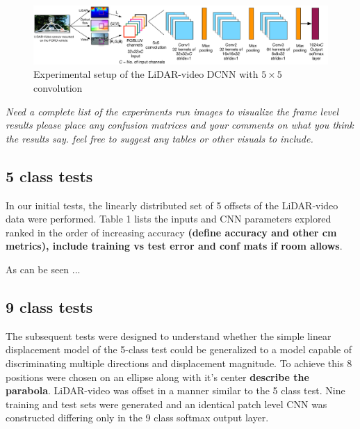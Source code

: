 \documentclass{article}
\begin{document}
\begin{figure}[htbp]
    \centering
        \includegraphics[scale=0.35]{Figures/lidar_dcnn_setup1.pdf}
    \caption{Experimental setup of the LiDAR-video DCNN with $5\times5$ convolution}
    \label{fig:Figures_lidar_dcnn_setup1}
\end{figure}

\textit{Need a complete list of the experiments run
images to visualize the frame level results
please place any confusion matrices and your comments on what you think the results say.
feel free to suggest any tables or other visuals to include.}




\subsection{5 class tests} %
\label{sub:5_class_tests}
In our initial tests, the linearly distributed set of 5 offsets of the LiDAR-video data were performed. Table 1 lists the inputs and CNN parameters explored ranked in the order of increasing accuracy \textbf{(define accuracy and other cm metrics), include training vs test error and conf mats if room allows}.  

As can be seen ... 


\subsection{9 class tests} %
\label{sub:9_class_tests}
The subsequent tests were designed to understand whether the simple linear displacement model of the 5-class test could be generalized to a model capable of discriminating multiple directions and displacement magnitude. To achieve this 8 positions were chosen on an ellipse along with it's center \textbf{describe the parabola}. LiDAR-video was offset in a manner similar to the 5 class test. Nine training and test sets were generated and an identical patch level CNN was constructed differing only in the 9 class softmax output layer. 
\end{document}
